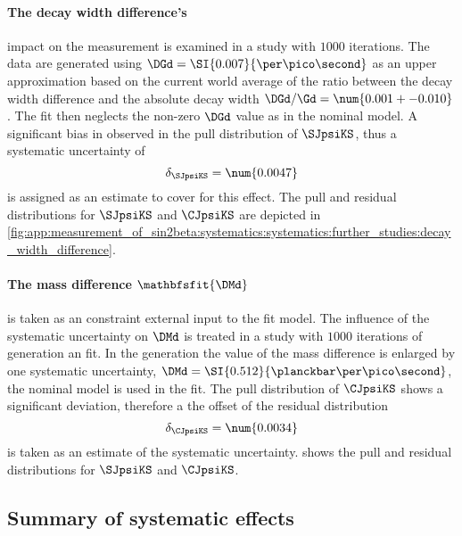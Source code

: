 \paragraph{The \Bdbfsf decay width difference's} impact on the \CP measurement
is examined in a \ToyMC study with $\num{1000}$ iterations. The data are
generated using $\DGd = \SI{0.007}{\per\pico\second}$ as an upper approximation
based on the current world average of the ratio between the decay width
difference and the absolute decay width $\DGd/\Gd = \num{0.001 +- 0.010}$
\cite{Amhis:2014hma}. The fit then neglects the non-zero $\DGd$ value as in the
nominal model. A significant bias in observed in the pull distribution of
$\SJpsiKS$, thus a systematic uncertainty of
%
\begin{equation}
  \delta_{\SJpsiKS} = \num{0.0047}
\end{equation}
%
is assigned as an estimate to cover for this effect. The pull and residual
distributions for $\SJpsiKS$ and $\CJpsiKS$ are depicted in 
\cref{fig:app:measurement_of_sin2beta:systematics:systematics:further_studies:decay_width_difference}.

\paragraph{The \Bdbfsf mass difference $\mathbfsfit{\DMd}$} is taken as an constraint
external input to the fit model. The influence of the systematic uncertainty on
$\DMd$ is treated in a \ToyMC study with $\num{1000}$ iterations of generation
an fit. In the generation the value of the mass difference is enlarged by one
systematic uncertainty, \ie $\DMd = \SI{0.512}{\planckbar\per\pico\second}$, the
nominal model is used in the fit. The pull distribution of $\CJpsiKS$ shows a
significant deviation, therefore a the offset of the residual distribution
%
\begin{equation}
  \delta_{\CJpsiKS} = \num{0.0034}
\end{equation}
%
is taken as an estimate of the systematic uncertainty.
shows the pull and residual distributions for $\SJpsiKS$ and $\CJpsiKS$.

\subsection{Summary of systematic effects}
\label{sec:measurement_of_sin2beta:systematics:summary}

